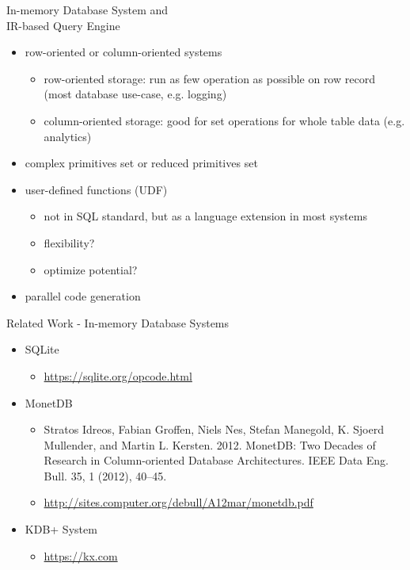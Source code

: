 \documentclass{beamer}
\begin{document}
\begin{frame}{In-memory Database System and \\ IR-based Query Engine}
\begin{itemize}
    \item row-oriented or column-oriented systems
          \begin{itemize}
          \item row-oriented storage: run as few operation as
                possible on row record (most database use-case, e.g. logging)
          \item column-oriented storage: good for set operations for whole
                table data (e.g. analytics)
          \end{itemize}
    \item complex primitives set or reduced primitives set
    \item user-defined functions (UDF) 
          \begin{itemize}
          \item not in SQL standard, but as a language extension in most
                systems
          \item flexibility?
          \item optimize potential?
          \end{itemize}
    \item parallel code generation
\end{itemize}
\end{frame}

\begin{frame}[fragile]{Related Work - In-memory Database Systems}
\begin{itemize}
\item SQLite
      \begin{itemize}
      \item \href{https://sqlite.org/opcode.html}
                 {https://sqlite.org/opcode.html}
      \end{itemize}
      \item MonetDB
      \begin{itemize}
      \item Stratos Idreos, Fabian Groffen, Niels Nes, Stefan Manegold,
            K. Sjoerd Mullender, and Martin L. Kersten. 2012. MonetDB:
            Two Decades of Research in Column-oriented Database
            Architectures. IEEE Data Eng. Bull. 35, 1 (2012), 40–45.
      \item \href{http://sites.computer.org/debull/A12mar/monetdb.pdf}
                 {http://sites.computer.org/debull/A12mar/monetdb.pdf}
      \end{itemize}
      \item KDB+ System
      \begin{itemize}
      \item \href{https://kx.com}{https://kx.com}
      \end{itemize}
\end{itemize}
\end{frame}
\end{document}
